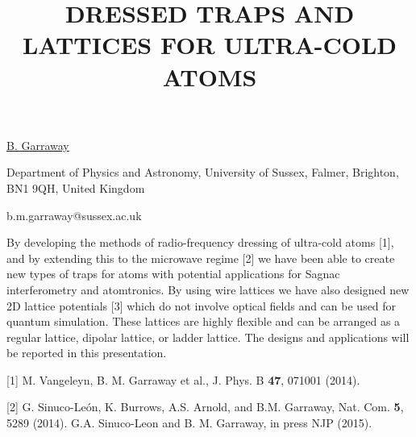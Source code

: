 \title{DRESSED TRAPS AND LATTICES FOR ULTRA-COLD ATOMS}

\underline{B. Garraway} 

{\normalsize{\vspace{-4mm}
Department of Physics and Astronomy, University of Sussex, Falmer,
Brighton, BN1 9QH, United Kingdom

\email b.m.garraway@sussex.ac.uk}}

By developing the methods of radio-frequency dressing of ultra-cold atoms [1], and by extending this to the microwave regime [2] we have been able to create new types of traps for atoms with potential applications for Sagnac interferometry and atomtronics. By using wire lattices we have also designed new 2D lattice potentials [3] which do not involve optical fields and can be used for quantum simulation. These lattices are highly flexible and can be arranged as a regular lattice, dipolar lattice, or ladder lattice. The designs and applications will be reported in this presentation.


{\normalsize
[1] M. Vangeleyn, B. M. Garraway et al., J. Phys. B \textbf{47}, 071001 (2014).
\vsp

[2] G. Sinuco-Le\'{o}n, K. Burrows, A.S. Arnold, and B.M. Garraway, Nat. Com. \textbf{5}, 5289 (2014).
\vsp
[3] G.A. Sinuco-Leon and B. M. Garraway, in press NJP (2015).
}

\vspace{\baselineskip}
